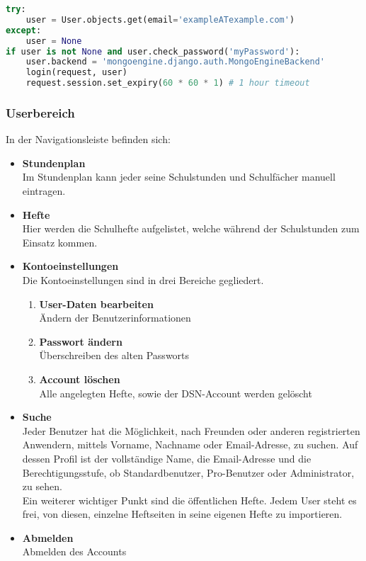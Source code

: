 \begin{lstlisting}[caption={Session Timeout}, language=Python]
try:
    user = User.objects.get(email='exampleATexample.com')
except:
    user = None
if user is not None and user.check_password('myPassword'):
    user.backend = 'mongoengine.django.auth.MongoEngineBackend'
    login(request, user)
    request.session.set_expiry(60 * 60 * 1) # 1 hour timeout
\end{lstlisting}

\subsubsection{Userbereich}


In der Navigationsleiste befinden sich:
\begin{itemize}
\item \textbf{Stundenplan}\\ Im Stundenplan kann jeder seine Schulstunden und Schulfächer manuell eintragen.
\item \textbf{Hefte}\\ Hier werden die Schulhefte aufgelistet, welche während der Schulstunden zum Einsatz kommen.
\item \textbf{Kontoeinstellungen}\\ Die Kontoeinstellungen sind in drei Bereiche gegliedert.
\begin{enumerate}
\item \textbf{User-Daten bearbeiten}\\ Ändern der Benutzerinformationen
\item \textbf{Passwort ändern}\\ Überschreiben des alten Passworts
\item \textbf{Account löschen}\\ Alle angelegten Hefte, sowie der DSN-Account werden gelöscht
\end{enumerate}
\newpage
\item \textbf{Suche}\\ Jeder Benutzer hat die Möglichkeit, nach Freunden oder anderen registrierten Anwendern, mittels Vorname, Nachname oder Email-Adresse, zu suchen. Auf dessen Profil ist der vollständige Name, die Email-Adresse und die Berechtigungsstufe, ob Standardbenutzer, Pro-Benutzer oder Administrator, zu sehen.\\
Ein weiterer wichtiger Punkt sind die öffentlichen Hefte. Jedem User steht es frei, von diesen, einzelne Heftseiten in seine eigenen Hefte zu importieren.
\item \textbf{Abmelden}\\ Abmelden des Accounts
\end{itemize}

